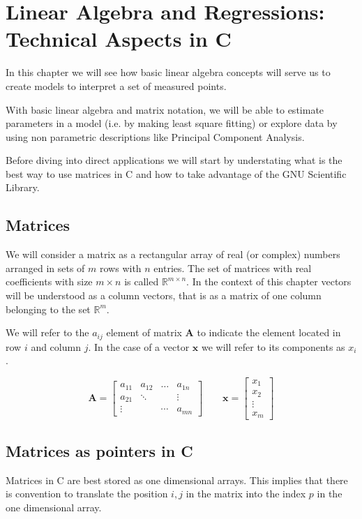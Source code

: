 \documentclass{article}
\newcommand{\real}{\mathbb{R}}
\begin{document}
\setcounter{section}{3}
\section{Linear Algebra and Regressions: Technical Aspects in C}
In this chapter we will see how basic linear algebra concepts will serve us to create models to interpret a set of measured points.

With basic linear algebra and matrix notation, we will be able to estimate parameters in a model (i.e. by making least square fitting) or explore data by using non parametric descriptions like Principal Component Analysis.

Before diving into direct applications we will start by 
understating what is the best way to use matrices in C and how to take advantage of the GNU Scientific Library.


\subsection{Matrices}
We will consider a matrix as a rectangular array of real (or complex) numbers arranged in sets of $m$ rows with $n$ entries. The set of matrices with real coefficients with size $m\times n$ is called $\real^{m\times n}$. In the context of this chapter vectors will be understood as a column vectors, that is as a matrix of one column belonging to the set $\real^{m}$. 

We will refer to the $a_{ij}$ element of matrix ${\mathbf A}$ to indicate the element located in row $i$ and column $j$. In the case of a vector ${\mathbf x}$ we will refer to its components as $x_{i}$.


\begin{displaymath}
\mathbf{A} = 
\left[
\begin{array}{cccc}
a_{11}  & a_{12}  & \dots & a_{1n}   \\
a_{21}  &  \ddots &  & \vdots  \\
\vdots  &  & \cdots & a_{mn}   
\end{array}
\right]
\qquad
\mathbf{x} = 
\left[
\begin{array}{c}
x_{1}     \\
x_2          \\
\vdots     \\
x_{m}   
\end{array}
\right]
\end{displaymath}


\subsection{Matrices as pointers in C}
Matrices in C are best stored as one dimensional arrays. This implies that there is convention to translate the position $i,j$ in the matrix into the index $p$ in the one dimensional array. 
\end{document}
